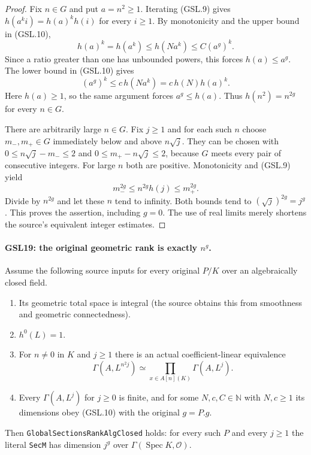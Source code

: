 \begin{proof}
Fix $n\in G$ and put $a=n^2\ge1$.  Iterating (GSL.9) gives
$h(a^ki)=h(a)^kh(i)$ for every $i\ge1$.  By monotonicity and
the upper bound in (GSL.10),
\[
 h(a)^k=h(a^k)\le h(Na^k)\le C(a^g)^k.
\]
Since a ratio greater than one has unbounded powers, this
forces $h(a)\le a^g$.  The lower bound in (GSL.10) gives
\[
 (a^g)^k\le c\,h(Na^k)=c\,h(N)h(a)^k.
\]
Here $h(a)\ge1$, so the same argument forces $a^g\le h(a)$.
Thus $h(n^2)=n^{2g}$ for every $n\in G$.

There are arbitrarily large $n\in G$.  Fix $j\ge1$ and for each
such $n$ choose $m_-,m_+\in G$ immediately below and above
$n\sqrt j$.  They can be chosen with
$0\le n\sqrt j-m_-\le2$ and
$0\le m_+-n\sqrt j\le2$, because $G$ meets every pair of
consecutive integers.  For large $n$ both are positive.
Monotonicity and (GSL.9) yield
\[
 m_-^{2g}\le n^{2g}h(j)\le m_+^{2g}.
\]
Divide by $n^{2g}$ and let these $n$ tend to infinity.
Both bounds tend to $(\sqrt j)^{2g}=j^g$.
This proves the assertion, including $g=0$.  The use of real
limits merely shortens the source's equivalent integer estimates.
\end{proof}

\paragraph{GSL19: the original geometric rank is exactly \(n^g\).}
\label{claim:GSL19}
Assume the following source inputs for every original $P/K$ over
an algebraically closed field.

\begin{enumerate}
 \item Its geometric total space is integral (the source obtains this
 from smoothness and geometric connectedness).
 \item $h^0(L)=1$.
 \item For $n\ne0$ in $K$ and $j\ge1$ there is an actual
 coefficient-linear equivalence
 \[
 \Gamma(A,L^{n^2j})\simeq
       \prod_{x\in A[n](K)}\Gamma(A,L^j).
 \tag{GSL.11}
 \]
 \item Every $\Gamma(A,L^j)$ for $j\ge0$ is finite, and for some
 $N,c,C\in\mathbb N$ with $N,c\ge1$ its dimensions obey
 (GSL.10) with the original $g=P.g$.
\end{enumerate}
Then \texttt{GlobalSectionsRankAlgClosed} holds: for every such
$P$ and every $j\ge1$ the literal \texttt{SecM} has dimension $j^g$
over $\Gamma(\operatorname{Spec}K,\mathcal O)$.

